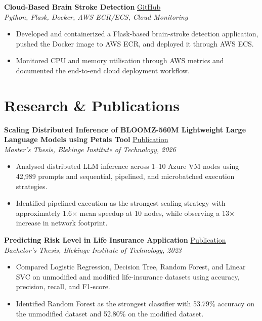 \documentclass[10pt,a4paper]{article}
\newcommand{\projectHeading}[3]{
    \Needspace{7\baselineskip}
    \textbf{#1} \hfill \href{#2}{GitHub}\\[-1pt]
    \textit{#3}
    \vspace{-2pt}
}
\begin{document}
\projectHeading
{Cloud-Based Brain Stroke Detection}
{https://github.com/veera491/cloud-brain-stroke-detection-flask-aws}
{Python, Flask, Docker, AWS ECR/ECS, Cloud Monitoring}
\begin{itemize}
    \item Developed and containerized a Flask-based brain-stroke detection application, pushed the Docker image to AWS ECR, and deployed it through AWS ECS.
    \item Monitored CPU and memory utilisation through AWS metrics and documented the end-to-end cloud deployment workflow.
\end{itemize}

\section{Research \& Publications}

\noindent
\textbf{Scaling Distributed Inference of BLOOMZ-560M Lightweight Large Language Models using Petals Tool}
\hfill \href{https://www.diva-portal.org/smash/record.jsf?pid=diva2%3A2052191}{Publication}\\
\textit{Master's Thesis, Blekinge Institute of Technology, 2026}
\begin{itemize}
    \item Analysed distributed LLM inference across 1--10 Azure VM nodes using 42,989 prompts and sequential, pipelined, and microbatched execution strategies.
    \item Identified pipelined execution as the strongest scaling strategy with approximately 1.6$\times$ mean speedup at 10 nodes, while observing a 13$\times$ increase in network footprint.
\end{itemize}

\noindent
\textbf{Predicting Risk Level in Life Insurance Application}
\hfill \href{https://www.diva-portal.org/smash/record.jsf?pid=diva2%3A1784294}{Publication}\\
\textit{Bachelor's Thesis, Blekinge Institute of Technology, 2023}
\begin{itemize}
    \item Compared Logistic Regression, Decision Tree, Random Forest, and Linear SVC on unmodified and modified life-insurance datasets using accuracy, precision, recall, and F1-score.
    \item Identified Random Forest as the strongest classifier with 53.79\% accuracy on the unmodified dataset and 52.80\% on the modified dataset.
\end{itemize}
\end{document}
